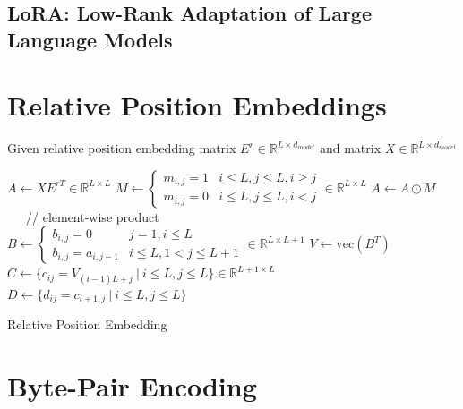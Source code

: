 \documentclass[11pt]{article}
\theoremstyle{definition}
\begin{document}
\subsection{LoRA: Low-Rank Adaptation of Large Language Models \cite{hu2021lora}}

\section{Relative Position Embeddings}

Given relative position embedding matrix $E^r \in \mathbb{R}^{L \times d_{model}}$ and matrix $X \in \mathbb{R}^{L \times d_{model}}$

\begin{algorithm}
\SetNoFillComment
{} 
$A \leftarrow XE^{rT} \in \mathbb{R}^{L \times L}$\;
$M \leftarrow \begin{cases} m_{i,j} = 1 & i \leq L, j \leq L, i \geq j \\ m_{i,j} = 0 & i \leq L, j \leq L, i < j \end{cases} \in \mathbb{R}^{L \times L}$\;
$A \leftarrow A \odot M$ \ \ \ // element-wise product\;
$B \leftarrow \begin{cases} b_{i,j} = 0 & j=1, i \leq L \\ b_{i,j} = a_{i,j-1} & i \leq L, 1 < j \leq L+1 \end{cases} \in \mathbb{R}^{L \times L+1}$\;
$V \leftarrow \mathrm{vec} (B^T)$\;
$C \leftarrow \{c_{ij} = V_{(i-1)L + j} \ | \ i \leq L, j \leq L \} \in \mathbb{R}^{L+1 \times L}$\;
$D \leftarrow \{d_{ij} = c_{i+1,j} \ | \ i \leq L, j \leq L\}$\;
\;
\caption{Relative Position Embedding}\label{rel-pos-emb}
\end{algorithm}


\section{Byte-Pair Encoding} \label{BPE}
\end{document}
